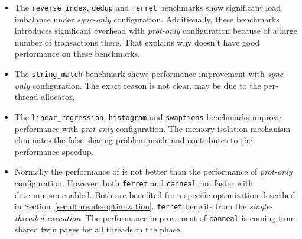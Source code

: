 \begin{itemize}

\item
The \texttt{reverse\_index}, \texttt{dedup} and \texttt{ferret} benchmarks show significant load imbalance under {\it sync-only} configuration. Additionally, these benchmarks introduces significant overhead with {\it prot-only} configuration because of a large number of transactions there. That explains why \dthreads{} doesn't have good performance on these benchmarks.

\item
The \texttt{string\_match} benchmark shows performance improvement with {\it sync-only} configuration. The exact reason is not clear, may be due to the per-thread allocator. 

\item
The \texttt{linear\_regression}, \texttt{histogram} and \texttt{swaptions} benchmarks improve performance with {\it prot-only} configuration. The memory isolation mechanism eliminates the false sharing problem inside and contributes to the performance speedup.

\item
Normally the performance of \dthreads{} is not better than the performance of {\it prot-only} configuration. However, both \texttt{ferret} and \texttt{canneal} run faster with determinism enabled. Both are benefited from specific optimization described in Section~\ref{sec:dthreads-optimization}. \texttt{ferret} benefits from the \emph{single-threaded-execution}. The performance improvement of \texttt{canneal} is coming from shared twin pages for all threads in the phase.

\end{itemize}





